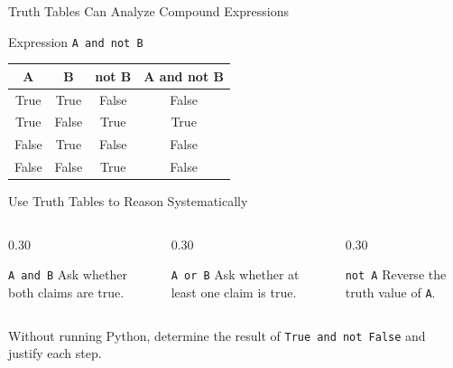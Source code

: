 \documentclass[aspectratio=169,10pt]{beamer}
\begin{document}
\begin{frame}{Truth Tables Can Analyze Compound Expressions}
  \begin{block}{Expression}
    \centering
    \Large\texttt{A and not B}
  \end{block}

  \begin{center}
    \renewcommand{\arraystretch}{1.35}
    \begin{tabular}{c|c|c|c}
      \textbf{A} & \textbf{B} & \textbf{not B} & \textbf{A and not B} \\\hline
      True & True & False & False \\
      True & False & True & True \\
      False & True & False & False \\
      False & False & True & False
    \end{tabular}
  \end{center}
\end{frame}

\begin{frame}{Use Truth Tables to Reason Systematically}
  \begin{columns}[T,onlytextwidth]
    \begin{column}{0.30\textwidth}
      \begin{block}{\texttt{A and B}}
        Ask whether both claims are true.
      \end{block}
    \end{column}

    \begin{column}{0.30\textwidth}
      \begin{block}{\texttt{A or B}}
        Ask whether at least one claim is true.
      \end{block}
    \end{column}

    \begin{column}{0.30\textwidth}
      \begin{block}{\texttt{not A}}
        Reverse the truth value of \texttt{A}.
      \end{block}
    \end{column}
  \end{columns}

  \begin{activity}
    Without running Python, determine the result of \texttt{True and not False} and justify each step.
  \end{activity}
\end{frame}
\end{document}
